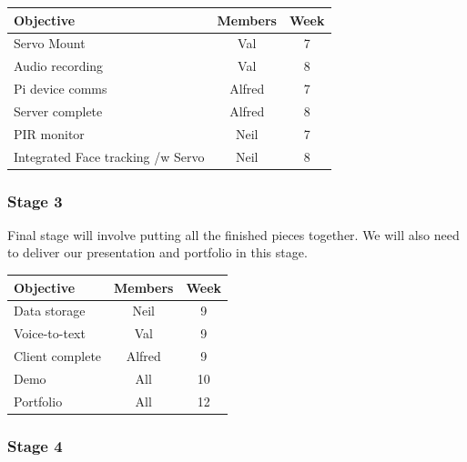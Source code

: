 \documentclass[11pt,a4paper,titlepage]{report}
\begin{document}
\begin{center}
\begin{table}[H]
\begin{tabular}{|l|c|c|}
    \hline
    \textbf{Objective} & \textbf{Members} & \textbf{Week} \\ \hline
    
    Servo Mount & Val & 7 \\ \hline
    Audio recording & Val & 8 \\ \hline
    Pi device comms & Alfred & 7 \\ \hline
    Server complete & Alfred & 8 \\ \hline
    PIR monitor & Neil & 7 \\ \hline
    Integrated Face tracking /w Servo & Neil & 8 \\ \hline


\end{tabular}
\end{table}
\end{center}


\subsubsection{Stage 3}

Final stage will involve putting all the finished pieces together. We will also need to deliver our presentation and portfolio in this stage.


\begin{center}
\begin{table}[H]
\begin{tabular}{|l|c|c|}
    \hline
    \textbf{Objective} & \textbf{Members} & \textbf{Week} \\ \hline

    Data storage & Neil & 9 \\ \hline    
    Voice-to-text & Val & 9 \\ \hline    
    Client complete & Alfred & 9 \\ \hline    
    Demo & All & 10 \\ \hline    
    Portfolio & All & 12 \\ \hline    

\end{tabular}
\end{table}
\end{center}

\subsubsection{Stage 4}
\end{document}
